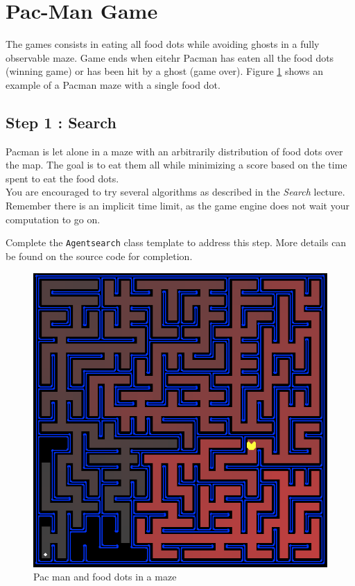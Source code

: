 \documentclass[12pt,a4paper,BCOR12mm, headexclude, footexclude, twoside, openright]{scrartcl}
\numberwithin{equation}{section} %
\numberwithin{figure}{section} %
\numberwithin{table}{section} %
\begin{document}
\section{Pac-Man Game}

The games consists in eating all food dots while avoiding ghosts in a fully observable maze. Game ends when eitehr Pacman has eaten all the food dots (winning game) or has been hit by a ghost (game over). Figure \ref{fullmaze} shows an example of a Pacman maze with a single food dot.

\subsection{Step 1 : Search}

Pacman is let alone in a maze with an arbitrarily distribution of food dots over the map. The goal is to eat them all while minimizing a score based on the time spent to eat the food dots.\\

You are encouraged to try several algorithms as described in the \emph{Search} lecture. Remember there is an implicit time limit, as the game engine does not wait your computation to go on.

Complete the \texttt{Agentsearch} class template to address this step. More details can be found on the source code for completion.

\begin{figure}
	\label{fullmaze}
	\begin{center}

	\includegraphics[scale=0.5]{pacmazefull.png}
    \caption{Pac man and food dots in a maze}
    \end{center}
\end{figure}
\end{document}
